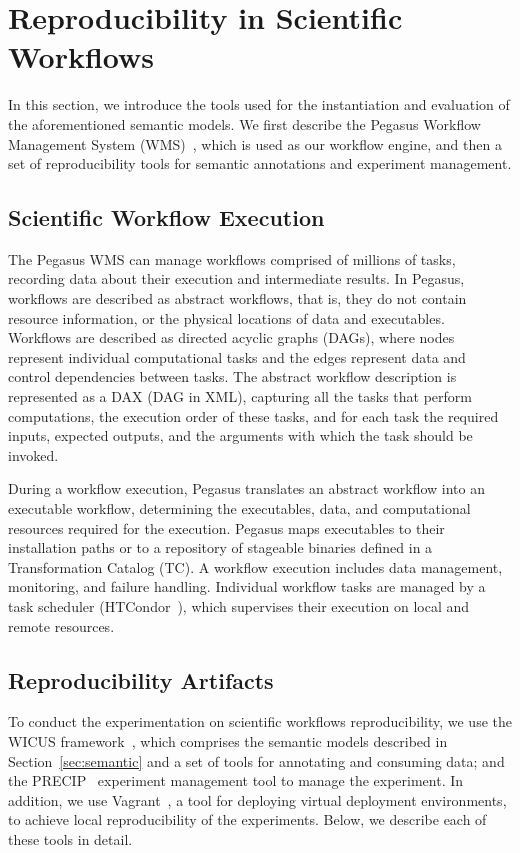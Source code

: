 \section{Reproducibility in Scientific Workflows}
\label{sec:reproducibility}

In this section, we introduce the tools used for the instantiation and evaluation 
of the aforementioned semantic models. We first describe the Pegasus Workflow 
Management System (WMS)~\cite{Pegasus, Deelman-FGCS-2014}, which is used as our 
workflow engine, and then a set of reproducibility tools for semantic annotations and 
experiment management.


\subsection{Scientific Workflow Execution}

The Pegasus WMS can manage workflows comprised of millions of tasks, recording data 
about their execution and intermediate results. In Pegasus, workflows are described as 
abstract workflows, that is, they do not contain resource information, or the physical locations of 
data and executables. Workflows are described as directed acyclic graphs (DAGs), where 
nodes represent individual computational tasks and the edges represent data and control 
dependencies between tasks. The abstract workflow description is represented as a DAX 
(DAG in XML), capturing all the tasks that perform computations, the execution order of these 
tasks, and for each task the required inputs, expected outputs, and the arguments with which 
the task should be invoked. 

During a workflow execution, Pegasus translates an abstract workflow into an 
executable workflow, determining the executables, data, and computational resources 
required for the execution. Pegasus maps executables to their installation paths or to a 
repository of stageable binaries defined in a Transformation Catalog (TC). A workflow 
execution includes data management, monitoring, and failure handling. Individual workflow 
tasks are managed by a task scheduler (HTCondor~\cite{condor}), which supervises their 
execution on local and remote resources.


\subsection{Reproducibility Artifacts}

To conduct the experimentation on scientific workflows reproducibility, we 
use the WICUS framework~\cite{wicus}, which comprises the semantic models described 
in Section~\ref{sec:semantic} and a set of tools for annotating and consuming data; and 
the PRECIP~\cite{Azarnoosh-CRC-2013} experiment management tool to manage the 
experiment. In addition, we use Vagrant~\cite{palat2012introducing}, a tool for deploying virtual
deployment environments,  to achieve local reproducibility of the experiments. 
Below, we describe each of these tools in detail.


